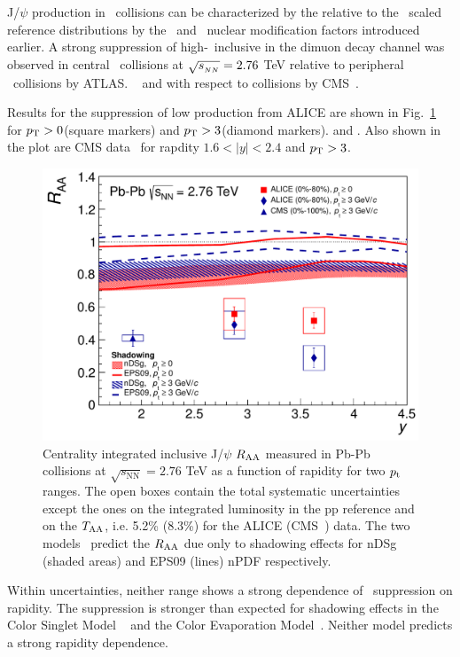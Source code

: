 J/$\psi$ production in \PbPb\ collisions can be characterized by the relative to the \Ncoll\ scaled reference 
distributions by the \Rcp\ and \Raa\ nuclear modification factors introduced earlier.
A strong suppression of high-\pT\ inclusive \jpsi in the dimuon decay channel was observed in central \PbPb\ collisions
at $\sqrt{s_{_{NN}}} = 2.76$ TeV  relative to peripheral \PbPb\ collisions by ATLAS.
~\cite{Aad:2010aa} and with respect to \pp collisions by CMS~\cite{Chatrchyan:2012np}.

Results for the suppression of low \pT \jpsi production from ALICE are shown 
in Fig.~\ref{fig:GR:raavsy} for $\mbox{$p_{\mathrm{T}}$} > 0$\GeVc (square markers) and 
$\mbox{$p_{\mathrm{T}}$} > 3$\GeVc (diamond markers). and . Also shown in the plot are CMS data~\cite{Chatrchyan:2012np} 
for rapdity $ 1.6 < |y| < 2.4 $ and $\mbox{$p_{\mathrm{T}}$} > 3$\GeVc. 

\begin{figure}
\begin{center}
\includegraphics[width=0.49\linewidth]{qqbarfigures/RAAvsY_v7-eps-converted-to.pdf}
\caption{ \label{fig:GR:raavsy}  Centrality integrated inclusive J/$\psi$ $R_{\rm{AA}}$ measured in Pb-Pb
collisions at $\sqrt{s_{\mathrm{NN}}} = 2.76$ TeV as a function of  rapidity  for two $p_{\rm{t}}$ ranges.
The open boxes contain the total systematic uncertainties except the ones on the integrated luminosity in the pp reference
 and on the $T_{\rm{AA}}$, i.e.  5.2\% (8.3\%) for the  ALICE (CMS~\cite{Chatrchyan:2012np}) data.
The two models~\cite{Ferreiro:2011rw,Vogt:2010aa} predict the  $R_{\rm{AA}}$  due  only to shadowing effects
for  nDSg (shaded areas) and EPS09 (lines) nPDF respectively.}
\end{center}
\end{figure}

Within uncertainties, neither \pT range shows a strong dependence of \jpsi\ suppression on rapidity. 
The suppression is stronger than expected for shadowing effects in the Color Singlet Model
~\cite{Ferreiro:2011rw} and the Color Evaporation Model~\cite{Vogt:2010aa}. Neither model
predicts a strong rapidity dependence.

